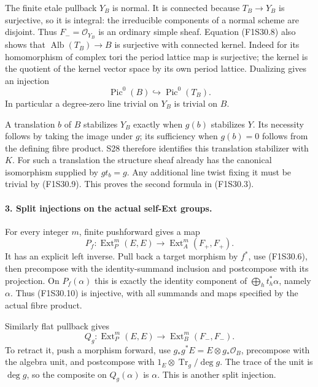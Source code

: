 The finite etale pullback $Y_B$ is normal. It is
connected because $T_B\to Y_B$ is surjective, so it
is integral: the irreducible components of a normal
scheme are disjoint. Thus $F_-=\mathcal O_{Y_B}$ is
an ordinary simple sheaf. Equation (F1S30.8) also
shows that $\operatorname{Alb}(T_B)\to B$ is
surjective with connected kernel. Indeed for its
homomorphism of complex tori the period lattice
map is surjective; the kernel is the quotient of
the kernel vector space by its own period lattice.
Dualizing gives an injection
\[
                     \operatorname{Pic}^0(B)\hookrightarrow
                                            \operatorname{Pic}^0(T_B).
 \tag{F1S30.9}
\]
In particular a degree-zero line trivial on $Y_B$
is trivial on $B$.

A translation $b$ of $B$ stabilizes $Y_B$ exactly
when $g(b)$ stabilizes $Y$. Its necessity follows
by taking the image under $g$; its sufficiency
when $g(b)=0$ follows from the defining fibre
product. S28 therefore identifies this translation
stabilizer with $K$. For such a translation the
structure sheaf already has the canonical
isomorphism supplied by $g t_b=g$. Any additional
line twist fixing it must be trivial by (F1S30.9).
This proves the second formula in (F1S30.3).

\paragraph{3. Split injections on the actual self-Ext groups.}
For every integer $m$, finite pushforward gives a
map
\[
 P_f:\operatorname{Ext}^m_P(E,E)\longrightarrow
                          \operatorname{Ext}^m_A(F_+,F_+).
 \tag{F1S30.10}
\]
It has an explicit left inverse. Pull back a
target morphism by $f^*$, use (F1S30.6), then
precompose with the identity-summand inclusion
and postcompose with its projection. On $P_f(\alpha)$
this is exactly the identity component of
$\bigoplus_h t_h^*\alpha$, namely $\alpha$.
Thus (F1S30.10) is injective, with all summands
and maps specified by the actual fibre product.

Similarly flat pullback gives
\[
 Q_g:\operatorname{Ext}^m_P(E,E)\longrightarrow
                          \operatorname{Ext}^m_B(F_-,F_-).
 \tag{F1S30.11}
\]
To retract it, push a morphism forward, use
$g_*g^*E=E\otimes g_*\mathcal O_B$, precompose
with the algebra unit, and postcompose with
$1_E\otimes\operatorname{Tr}_g/\deg g$.
The trace of the unit is $\deg g$, so the
composite on $Q_g(\alpha)$ is $\alpha$.
This is another split injection.


